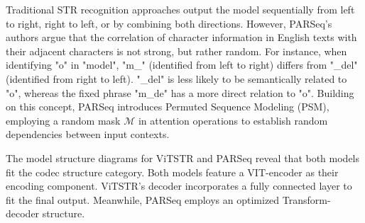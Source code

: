 \documentclass[runningheads]{llncs}
\begin{document}

Traditional STR recognition approaches output the model sequentially from left to right, right to left, or by combining both directions\cite{zhao2021handwritten_bttr}.	However, PARSeq's authors argue that the correlation of character information in English texts with their adjacent characters is not strong, but rather random.	For instance, when identifying "o" in "model", "m\_" (identified from left to right) differs from "\_del" (identified from right to left).	"\_del" is less likely to be semantically related to "o", whereas the fixed phrase "m\_de" has a more direct relation to "o".	Building on this concept, PARSeq introduces Permuted Sequence Modeling (PSM), employing a random mask $\mathcal{M}$ in attention operations to establish random dependencies between input contexts.	

The model structure diagrams for ViTSTR and PARSeq reveal that both models fit the codec structure category.	Both models feature a VIT-encoder as their encoding component.	ViTSTR's decoder incorporates a fully connected layer to fit the final output.	Meanwhile, PARSeq employs an optimized Transform-decoder structure.	
\end{document}
